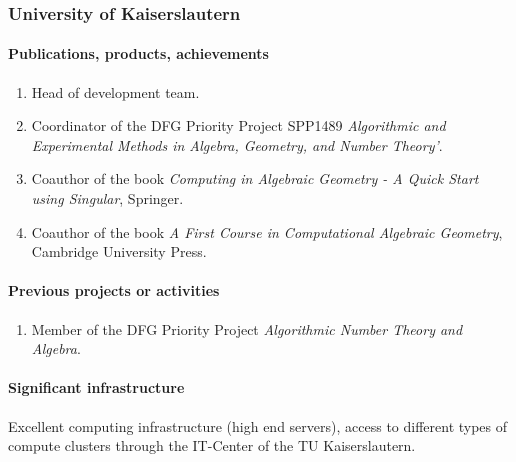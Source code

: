 \subsubsection{University of Kaiserslautern}






\paragraph{Publications, products, achievements}

\begin{enumerate}
\item Head of {} development team.
\item Coordinator of the DFG Priority Project SPP1489 \emph{Algorithmic and Experimental Methods in Algebra, Geometry, and
Number Theory'}.
\item Coauthor of the book \emph{Computing in Algebraic Geometry - A Quick Start using Singular}, Springer.
\item Coauthor of the book \emph{A First Course in Computational Algebraic Geometry}, 
Cambridge University Press.
\end{enumerate}

\paragraph{Previous projects or activities}

\begin{enumerate}
\item Member of the DFG Priority Project \emph{Algorithmic Number Theory and Algebra}.
\end{enumerate}

\paragraph{Significant infrastructure}

Excellent computing infrastructure (high end servers), access to 
different types of compute clusters through the IT-Center of the 
TU Kaiserslautern.


